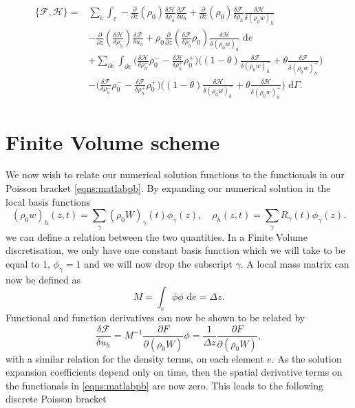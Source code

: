 \documentclass[a4paper,11pt]{article}
\begin{document}
 \begin{equation}\label{eqns:matlabpb}
\begin{aligned}
 \{ \mathcal{F},  \mathcal{H}\} = &  \sum_e \int_e - \frac{\partial}{\partial z}(\rho_0 ) \frac{\delta  \mathcal{H}}{\delta \rho_h} \frac{\delta  \mathcal{F}}{\delta u_h} + \frac{\partial}{\partial z}(\rho_0)\frac{\delta  \mathcal{F}}{\delta \rho_h}\frac{\delta  \mathcal{H}}{\delta (\rho_0 w)_h} \\
  &- \frac{\partial}{\partial z}(\frac{\delta  \mathcal{H}}{\delta \rho_h}) \frac{\delta  \mathcal{F}}{\delta u_h} + \rho_0  \frac{\partial}{\partial z}(\frac{\delta  \mathcal{F}}{\delta \rho_h}\rho_0)\frac{\delta  \mathcal{H}}{\delta (\rho_0 w)_h} \text{ d}e \\
 &+ \sum_{\partial e}\int_{\partial e } \bigg(  \frac{\delta  \mathcal{H}}{\delta \rho_h^-}\rho_0^- -\frac{\delta  \mathcal{H}}{\delta \rho_h^+}\rho_0^+\bigg)\bigg ( (1-\theta) \frac{\delta  \mathcal{F}}{\delta  (\rho_0 w)_h^-}+ \theta\frac{\delta  \mathcal{F}}{\delta  (\rho_0 w)_h^+} \bigg)\\
 & - \bigg(  \frac{\delta  \mathcal{F}}{\delta \rho_h^-}\rho_0^- -\frac{\delta  \mathcal{F}}{\delta \rho_h^+}\rho_0^+\bigg)\bigg ( (1-\theta) \frac{\delta  \mathcal{H}}{\delta  (\rho_0 w)_h^-}+ \theta\frac{\delta  \mathcal{H}}{\delta  (\rho_0 w)_h^+} \bigg) \text{ d} \Gamma.
 \end{aligned}
 \end{equation}

\section{Finite Volume scheme }


We now wish to relate our numerical solution functions to the functionals in our Poisson bracket \eqref{eqns:matlabpb}.
By expanding  our numerical solution in the local basis functions
\[ (\rho_0 w)_h(z,t) = \sum_\gamma (\rho_0 W)_\gamma (t) \phi_\gamma(z), \quad \rho_h(z,t) = \sum_\gamma R_\gamma (t) \phi_\gamma(z).\]
we can define a relation between the two quantities. 
In a  Finite Volume discretisation, we only have one constant basis function which we will take to be equal to 1, $\phi_\gamma = 1$ and we will now drop the subscript $\gamma$.
A local mass matrix can now be defined as  
\[ M = \int_e \phi \phi \text{ d}e = \Delta z.\]
Functional and function derivatives can now be shown to be related by
\[  \frac{\delta  \mathcal{F}}{\delta u_h}  =  M^{-1} \frac{\partial F}{\partial (\rho_0 W)} \phi = \frac{1}{\Delta z}  \frac{\partial F}{\partial (\rho_0 W)},\]
with a similar relation for the density terms, on each element $e$.
As the solution expansion coefficients depend only on time, then the spatial derivative terms on the functionals  in \eqref{eqns:matlabpb} are now zero. This leads to the following discrete Poisson bracket 
\end{document}
